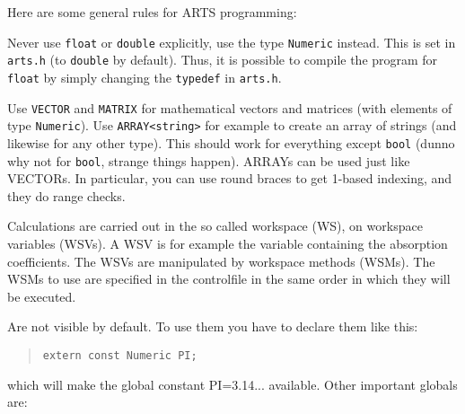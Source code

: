 \label{sec:development:conv}

Here are some general rules for ARTS programming:

\levelc{} Never use \verb|float| or \verb|double| explicitly, use the type \verb|Numeric|
instead.  This is set in \verb|arts.h| (to \verb|double| by default). Thus, it is
possible to compile the program for \verb|float| by simply changing the
\verb|typedef| in \verb|arts.h|.

\levelc{} Use \verb|VECTOR| and \verb|MATRIX| for mathematical vectors
and matrices (with elements of type \verb|Numeric|). Use
\verb|ARRAY<string>| for example to create an array of strings (and
likewise for any other type). This should work for everything except
\verb|bool| (dunno why not for \verb|bool|, strange things happen).
ARRAYs can be used just like VECTORs. In particular, you can use round
braces to get 1-based indexing, and they do range checks.

Calculations are carried out in the so called workspace (WS), on
workspace variables (WSVs). A WSV is for example the variable
containing the absorption coefficients. The WSVs are manipulated by 
workspace methods (WSMs). The WSMs to use are specified in the
controlfile in the same order in which they will be
executed. 

   Are not visible by default. To use them you have to declare them
   like this:
   \begin{quote}
   \verb|extern const Numeric PI;|
   \end{quote}
   which will make the global constant PI=3.14... available. Other important globals are:

